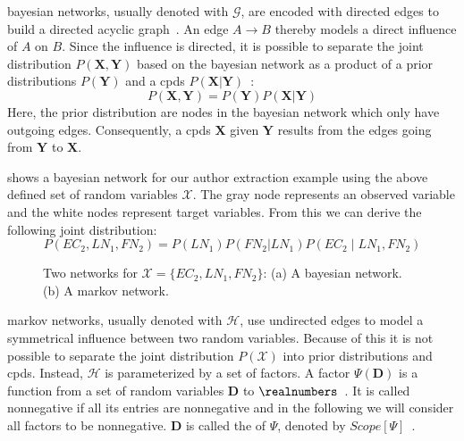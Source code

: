 \Glspl{bayesian network}, usually denoted with $\mathcal{G}$, are encoded with directed \glspl{edge} to build a directed acyclic graph~\citep{koller2009probabilistic}.
An \gls{edge} $A\to B$ thereby models a direct influence of $A$ on $B$.
Since the influence is directed, it is possible to separate the \gls{joint distribution} $P(\mathbf{X},\mathbf{Y})$ based on the \gls{bayesian network} as a product of a \glspl{prior distribution} $P(\mathbf{Y})$ and a \glspl{cpd} $P(\mathbf{X}|\mathbf{Y})$~\citep{sutton2010introduction}:
\begin{equation}
  P(\mathbf{X},\mathbf{Y})=P(\mathbf{Y})P(\mathbf{X}|\mathbf{Y})
\end{equation}
Here, the \gls{prior distribution} are \glspl{node} in the \gls{bayesian network} which only have outgoing \glspl{edge}.
Consequently, a \glspl{cpd} $\mathbf{X}$ given $\mathbf{Y}$ results from the \glspl{edge} going from $\mathbf{Y}$ to $\mathbf{X}$.

 shows a \gls{bayesian network} for our author extraction example using the above defined set of \glspl{random variable} $\mathcal{X}$.
The gray node represents an \gls{observed variable} and the white nodes represent \glspl{target variable}.
From this we can derive the following \gls{joint distribution}:
\begin{equation*}
  P(EC_2,LN_1,FN_2)=P(LN_1)P(FN_2|LN_1)P(EC_2\mid LN_1,FN_2)
\end{equation*}

\begin{figure}[t]
\centering

\caption[Two networks for $\mathcal{X}=\{EC_2,LN_1,FN_2\}$]{%
  Two networks for $\mathcal{X}=\{EC_2,LN_1,FN_2\}$:
  (a) A \gls{bayesian network}.
  (b) A \gls{markov network}.
}
\label{fig:example-networks}
\end{figure}

\bigskip

\Glspl{markov network}, usually denoted with $\mathcal{H}$, use undirected \glspl{edge} to model a symmetrical influence between two \glspl{random variable}.
Because of this it is not possible to separate the \gls{joint distribution} $P(\mathcal{X})$ into \glspl{prior distribution} and \glspl{cpd}.
Instead, $\mathcal{H}$ is parameterized by a set of \glspl{factor}.
A \gls{factor} $\Psi(\mathbf{D})$ is a function from a set of \glspl{random variable} $\mathbf{D}$ to $\realnumbers$~\citep{koller2009probabilistic}.
It is called nonnegative if all its entries are nonnegative and in the following we will consider all factors to be nonnegative.
$\mathbf{D}$ is called the  of $\Psi$, denoted by $Scope[\Psi]$~\citep{koller2009probabilistic}.

